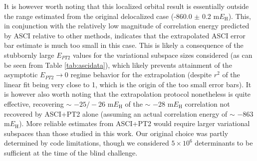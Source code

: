 \documentclass[journal=jcp,manuscript=suppinfo]{achemso}
\begin{document}
It is however worth noting that this localized orbital result is essentially outside the range estimated from the original delocalized case (-860.0 $\pm$ 0.2 m$E_{\text{H}}$). This, in conjunction with the relatively low magnitude of correlation energy predicted by ASCI relative to other methods, indicates that the extrapolated ASCI error bar estimate is much too small in this case. This is likely a consequence of the stubbornly large $E_{PT2}$ values for the variational subspace sizes considered (as can be seen from Table \ref{tab:ascidata}), which likely prevents attainment of the asymptotic $E_{PT2}\to 0$ regime behavior for the extrapolation (despite $r^2$ of the linear fit being very close to 1, which is the origin of the too small error bars). It is however also worth noting that the extrapolation protocol nonetheless is quite effective, recovering $\sim$ $-25/-26$ m$E_{\text{H}}$ of the $\sim$ $-28$ m$E_{\text{H}}$ correlation not recovered by ASCI+PT2 alone (assuming an actual correlation energy of $\sim$ $-863$ m$E_{\text{H}}$). More reliable estimates from ASCI+PT2 would require larger variational subspaces than those studied in this work. Our original choice was partly determined by code limitations, though we considered $5\times 10^6$ determinants to be sufficient at the time of the blind challenge. 
%
\end{document}
